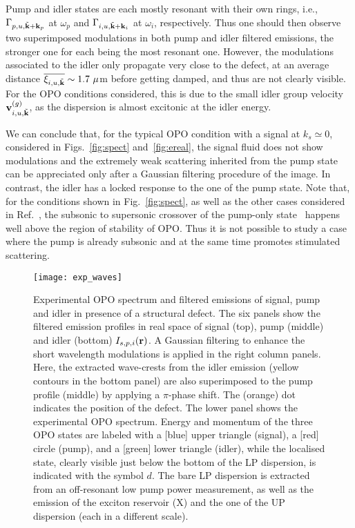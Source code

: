 Pump and idler states are each mostly resonant with their own
rings, i.e., $\Gamma_{p,u, \tilde{\mathbf{k}}+\mathbf{k}_p}$ at $\omega_p$
and $\Gamma_{i,u, \tilde{\mathbf{k}}+\mathbf{k}_i}$ at $\omega_i$,
respectively. Thus one should then observe two superimposed
modulations in both pump and idler filtered emissions, the stronger
one for each being the most resonant one.
%
However, the modulations associated to the idler only propagate very
close to the defect, at an average distance
$\overline{\xi_{i,u,\tilde{\mathbf{k}}}} \sim 1.7~\mu$m before getting
damped, and thus are not clearly visible. For the OPO conditions
considered, this is due to the small idler group velocity
$\mathbf{v}_{i,u,\tilde{\mathbf{k}}}^{(g)}$, as the dispersion is almost
excitonic at the idler energy.

We can conclude that, for the typical OPO condition with a signal at
$k_s \simeq 0$, considered in Figs.~\ref{fig:spect}
and~\ref{fig:ereal}, the signal fluid does not show modulations and
the extremely weak scattering inherited from the pump state can be
appreciated only after a Gaussian filtering procedure of the image. In
contrast, the idler has a locked response to the one of the pump
state.
%
Note that, for the conditions shown in Fig.~\ref{fig:spect}, as well
as the other cases considered in Ref.~\cite{SM}, the subsonic to
supersonic crossover of the pump-only state~\cite{Amo_2009} happens
well above the region of stability of OPO. Thus it is not possible to
study a case where the pump is already subsonic and at the same time
promotes stimulated scattering.

%
\begin{figure}[tb]\centering
  \texttt{[image: exp\_waves]}
\caption{Experimental OPO spectrum and filtered
  emissions of signal, pump and idler in presence of a structural
  defect. The six panels show the filtered emission profiles in real
  space of signal (top), pump (middle) and idler (bottom) $I_{s,
    p,i}(\mathbf{r})$. A Gaussian filtering to enhance the short
  wavelength modulations is applied in the right column panels. Here,
  the extracted wave-crests from the idler emission (yellow contours
  in the bottom panel) are also superimposed to the pump profile
  (middle) by applying a $\pi$-phase shift. The (orange) dot indicates
  the position of the defect. The lower panel shows the experimental
  OPO spectrum. Energy and momentum of the three OPO states are
  labeled with a [blue] upper triangle (signal), a [red] circle
  (pump), and a [green] lower triangle (idler), while the localised
  state, clearly visible just below the bottom of the LP dispersion,
  is indicated with the symbol $d$. The bare LP dispersion is
  extracted from an off-resonant low pump power measurement, as well
  as the emission of the exciton reservoir (X) and the one of the UP
  dispersion (each in a different scale).}
\label{fig:exper}
\end{figure}
%

